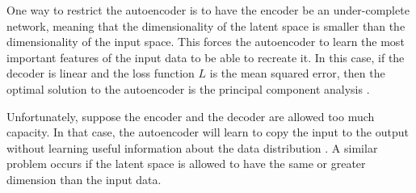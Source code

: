 One way to restrict the autoencoder is to have the encoder be an under-complete network, meaning that the dimensionality of the latent space is smaller than the dimensionality of the input space. This forces the autoencoder to learn the most important features of the input data to be able to recreate it. In this case, if the decoder is linear and the loss function $L$ is the mean squared error, then the optimal solution to the autoencoder is the principal component analysis \cite{Goodfellow-et-al-2016}. 

Unfortunately, suppose the encoder and the decoder are allowed too much capacity. In that case, the autoencoder will learn to copy the input to the output without learning useful information about the data distribution \cite{Goodfellow-et-al-2016}. A similar problem occurs if the latent space is allowed to have the same or greater dimension than the input data. 

